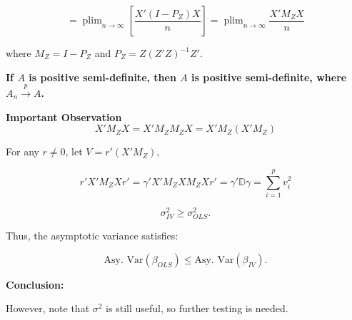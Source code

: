 \documentclass[12pt, oneside]{article}
\DeclareMathOperator*{\plim}{plim}
\begin{document}
\[
= \plim_{n \to \infty} \left[ \frac{X'(I - P_Z) X}{n} \right] = \plim_{n \to \infty} \frac{X' M_Z X}{n}
\]

where \( M_Z = I - P_Z \) and \( P_Z = Z (Z'Z)^{-1} Z' \).

\textbf{If \( A \) is positive semi-definite, then \( A \) is positive semi-definite, where \( A_n \xrightarrow{p} A \).}

\textbf*{Important Observation}
\[
X' M_Z X = X' M_Z M_Z X = X' M_Z (X' M_Z)
\]

For any \( r \neq 0 \), let \( V = r' (X' M_Z) \),

\[
r' X' M_Z X r' = \gamma' X' M_Z X M_Z X r' = \gamma' \mathbb{D} \gamma = \sum_{i=1}^{p} v_i^2
\]

\[
\sigma_{IV}^2 \geq \sigma_{OLS}^2.
\]

Thus, the asymptotic variance satisfies:

\[
\text{Asy. Var} (\beta_{OLS}) \leq \text{Asy. Var} (\beta_{IV}).
\]

\textbf*{Conclusion:}

However, note that \( \sigma^2 \) is still useful, so further testing is needed.
\end{document}

